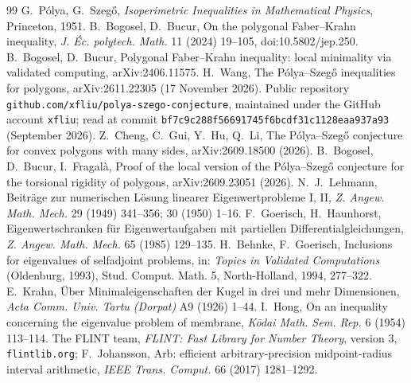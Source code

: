 \documentclass[11pt]{article}
\theoremstyle{remark}
\begin{document}
\begin{thebibliography}{99}
 G.~P\'olya, G.~Szeg\H{o}, \emph{Isoperimetric Inequalities in Mathematical Physics}, Princeton, 1951.
 B.~Bogosel, D.~Bucur, On the polygonal Faber--Krahn inequality, \emph{J. \'Ec. polytech. Math.} 11 (2024) 19--105, doi:10.5802/jep.250.
 B.~Bogosel, D.~Bucur, Polygonal Faber--Krahn inequality: local minimality via validated computing, arXiv:2406.11575.
 H.~Wang, The P\'olya--Szeg\H{o} inequalities for polygons, arXiv:2611.22305 (17 November 2026).
 Public repository \texttt{github.com/xfliu/polya-szego-conjecture}, maintained under the GitHub account \texttt{xfliu}; read at commit \texttt{bf7c9c288f56691745f6bcdf31c1128eaa937a93} (September 2026).
 Z.~Cheng, C.~Gui, Y.~Hu, Q.~Li, The P\'olya--Szeg\H{o} conjecture for convex polygons with many sides, arXiv:2609.18500 (2026).
 B.~Bogosel, D.~Bucur, I.~Fragal\`a, Proof of the local version of the P\'olya--Szeg\H{o} conjecture for the torsional rigidity of polygons, arXiv:2609.23051 (2026).
 N.~J.~Lehmann, Beitr\"age zur numerischen L\"osung linearer Eigenwertprobleme I, II, \emph{Z. Angew. Math. Mech.} 29 (1949) 341--356; 30 (1950) 1--16.
 F.~Goerisch, H.~Haunhorst, Eigenwertschranken f\"ur Eigenwertaufgaben mit partiellen Differentialgleichungen, \emph{Z. Angew. Math. Mech.} 65 (1985) 129--135.
 H.~Behnke, F.~Goerisch, Inclusions for eigenvalues of selfadjoint problems, in: \emph{Topics in Validated Computations} (Oldenburg, 1993), Stud. Comput. Math. 5, North-Holland, 1994, 277--322.
 E.~Krahn, \"Uber Minimaleigenschaften der Kugel in drei und mehr Dimensionen, \emph{Acta Comm. Univ. Tartu (Dorpat)} A9 (1926) 1--44.
 I.~Hong, On an inequality concerning the eigenvalue problem of membrane, \emph{K\={o}dai Math. Sem. Rep.} 6 (1954) 113--114.
 The FLINT team, \emph{FLINT: Fast Library for Number Theory}, version 3, \texttt{flintlib.org}; F.~Johansson, Arb: efficient arbitrary-precision midpoint-radius interval arithmetic, \emph{IEEE Trans. Comput.} 66 (2017) 1281--1292.
\end{thebibliography}
\end{document}
